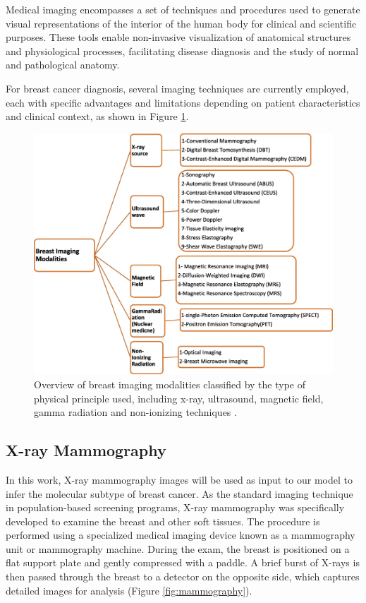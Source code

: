 \documentclass[a4paper,10pt]{book}
\begin{document}
Medical imaging encompasses a set of techniques and procedures used to generate visual representations of the interior of the human body for clinical and scientific purposes. These tools enable non-invasive visualization of anatomical structures and physiological processes, facilitating disease diagnosis and the study of normal and pathological anatomy.

For breast cancer diagnosis, several imaging techniques are currently employed, each with specific advantages and limitations depending on patient characteristics and clinical context, as shown in Figure \ref{fig:breast_cancer_medical}.

\begin{figure}[h!]
    \centering
    \includegraphics[width=0.75\linewidth]{reports//assets/medical_imaging.png}
    \caption[Overview of breast imaging modalities]{Overview of breast imaging modalities classified by the type of physical principle used, including x-ray, ultrasound, magnetic field, gamma radiation and non-ionizing techniques \cite{iranmakani_review_2020}.}
    \label{fig:breast_cancer_medical}
\end{figure}

\subsection{X-ray Mammography}

In this work, X-ray mammography images will be used as input to our model to infer the molecular subtype of breast cancer. As the standard imaging technique in population-based screening programs, X-ray mammography was specifically developed to examine the breast and other soft tissues. The procedure is performed using a specialized medical imaging device known as a mammography unit or mammography machine. During the exam, the breast is positioned on a flat support plate and gently compressed with a paddle. A brief burst of X-rays is then passed through the breast to a detector on the opposite side, which captures detailed images for analysis (Figure \ref{fig:mammography}).
\end{document}
